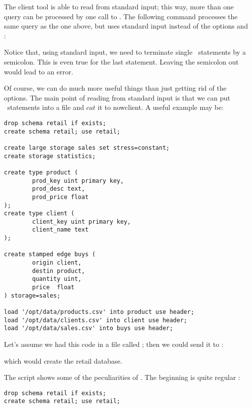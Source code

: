 The client tool is able to read from standard input;
this way, more than one query can be processed by one call
to .
The following command processes the same query as the one above,
but uses standard input instead of the options  and :


Notice that, using standard input,
we need to terminate single \sql\ statements
by a semicolon. This is even true for the last statement.
Leaving the semicolon out would lead to an error.

Of course, we can do much more useful things than just
getting rid of the options.
The main point of reading from standard input is
that we can put \sql\ statements into a file and
$cat$ it to nowclient. A useful example may be:

\begin{sqlcode}
\begin{lstlisting}
drop schema retail if exists;
create schema retail; use retail;

create large storage sales set stress=constant;
create storage statistics;

create type product (
        prod_key uint primary key,
        prod_desc text,
        prod_price float
);
create type client (
        client_key uint primary key,
        client_name text
);

create stamped edge buys (
        origin client,
        destin product,
        quantity uint,
        price  float
) storage=sales;

load '/opt/data/products.csv' into product use header;
load '/opt/data/clients.csv' into client use header;
load '/opt/data/sales.csv' into buys use header;
\end{lstlisting}
\end{sqlcode}

Let's assume we had this code in a file called
; then we could
send it to :


which would create the retail database.

The script shows some of the peculiarities of \nowdb.
The beginning is quite regular \sql:

\begin{sqlcode}
\begin{lstlisting}
drop schema retail if exists;
create schema retail; use retail;
\end{lstlisting}
\end{sqlcode}

